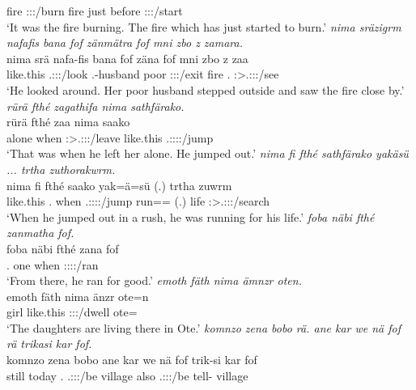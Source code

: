 \begin{exe}
	fire \Sg:\Sbj:\Pst:\Dur/burn fire just before \Sg:\Sbj:\Pst:\Pfv/start\\
	\trans `It was the fire burning. The fire which has just started to burn.'
	\emph{nima sräzigrm nafafis bana fof zänmätra fof mni zbo z zamara.}\\
	\gll nima srä nafa-fis bana fof zäna fof mni zbo z zaa\\
	{like.this} \Tsg.\Masc:\Sbj:\Irr:\Pfv/look \Third.\Poss-husband poor {\Emph} \Sg:\Sbj:\Pst:\Pfv/exit {\Emph} fire \Prox.{\All} {\Iam} \Sg:\Sbj>\Tsg.\F:\Obj:\Pst:\Pfv/see\\
	\trans `He looked around. Her poor husband stepped outside and saw the fire close by.'
	\emph{rürä fthé zagathifa nima sathfärako.}\\
	\gll rürä fthé zaa nima saako\\
	alone when \Sg:\Sbj>\Tsg.\F:\Obj:\Pst:\Pfv/leave {like.this} \Tsg.\Masc:\Sbj:\Pst:\Pfv:\Andat/jump\\
	\trans `That was when he left her alone. He jumped out.'
	\emph{nima fi fthé sathfärako yakäsü ... trtha zuthorakwrm.}\\
	\gll nima fi fthé saako yak=ä=sü (.) trtha zuwrm\\
	{like.this} \Third.{\Abs} when \Tsg.\Masc:\Sbj:\Pst:\Pfv:\Andat/jump run=\Assoc=\Etc{} (.) life \Sg:\Sbj>\Tsg.\F:\Obj:\Pst:\Dur/search\\
	\trans `When he jumped out in a rush, he was running for his life.'
	\emph{foba näbi fthé zanmatha fof.}\\
	\gll foba näbi fthé zana fof\\
	\Dist.{\Abl} one when \Sg:\Sbj:\Pst:\Pfv:\Venit/ran \Emph\\
	\trans `From there, he ran for good.'
	\emph{emoth fäth nima ämnzr oten.}\\
	\gll emoth fäth nima änzr ote=n\\
	girl \Dim{} {like.this} \Stpl:\Sbj:\Nonpast:\Ipfv/dwell ote={\Loc}\\
	\trans `The daughters are living there in Ote.'
	\emph{komnzo zena bobo rä. ane kar we nä fof rä trikasi kar fof.}\\
	\gll komnzo zena bobo  ane kar we nä fof  trik-si kar fof\\
	still today \Med.{\Abl} \Tsg.\F:\Sbj:\Nonpast:\Ipfv/be {\Dem} village also {\Indf} {\Emph} \Tsg.\F:\Sbj:\Nonpast:\Ipfv/be tell-{\Nmlz} village {\Emph}\\

\end{exe}
